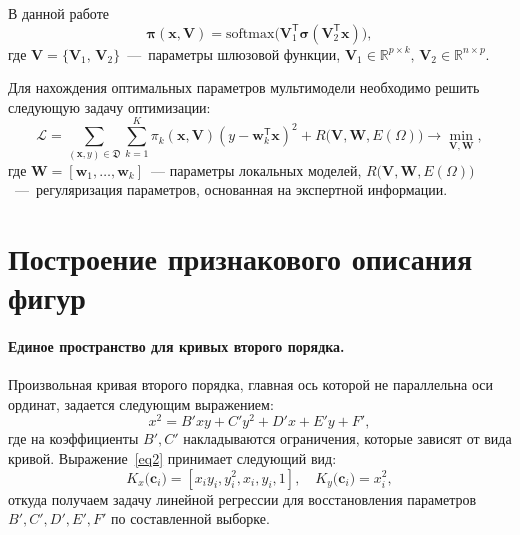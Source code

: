\documentclass[12pt, twoside]{article}
\numberwithin{equation}{section}
\begin{document}
В данной работе
\begin{equation}
    \boldsymbol{\pi}(\mathbf{x}, \mathbf{V}) = \text{softmax}\bigl(\mathbf{V}_1^{\mathsf{T}}\boldsymbol{\sigma}(\mathbf{V}_2^{\mathsf{T}}\mathbf{x}) \bigr),
\end{equation}
где $\mathbf{V} = \{ \mathbf{V}_1, \, \mathbf{V}_2\}$~---~параметры шлюзовой функции, $\mathbf{V}_1 \in \mathbb{R}^{p \times k}, \, \mathbf{V}_2 \in \mathbb{R}^{n \times p}$. 

Для нахождения оптимальных параметров мультимодели необходимо решить следующую задачу оптимизации:
\begin{equation}\label{9}
\mathcal{L} = \sum\limits_{(\mathbf{x}, y) \in \mathfrak{D}} \sum\limits_{k = 1}^{K} \pi_k(\mathbf{x}, \mathbf{V})(y - \mathbf{w}_k^{\mathsf{T}}\mathbf{x})^2 + R\bigl(\mathbf{V}, \mathbf{W}, E(\Omega)\bigr) \rightarrow \min_{\mathbf{V}, \mathbf{W}},
\end{equation}
где $\mathbf{W} = [\mathbf{w}_1, \dots, \mathbf{w}_k]$~--- параметры локальных моделей, $R\bigl(\mathbf{V}, \mathbf{W}, E(\Omega)\bigr)$~---~регуляризация параметров, основанная на экспертной информации.

\section{Построение признакового описания фигур}
\paragraph{Единое пространство для кривых второго порядка.} Произвольная кривая второго порядка, главная ось которой не параллельна оси ординат, задается следующим выражением:
\[
\label{st:coef}
x^2 = B'xy+C'y^2+D'x+E'y+F',
\]
где на коэффициенты $B',C'$ накладываются ограничения, которые зависят от вида кривой. Выражение~\eqref{eq2} принимает следующий вид:
\[
\label{st:K_map}
K_x\bigr(\mathbf{c}_i\bigr)=\left[x_iy_i, y_i^2, x_i, y_i, 1\right], \quad K_y\bigr(\mathbf{c}_i\bigr)=x_i^2,
\]
откуда получаем задачу линейной регрессии для восстановления параметров~$B', C', D', E', F'$ по составленной выборке.
\end{document}
